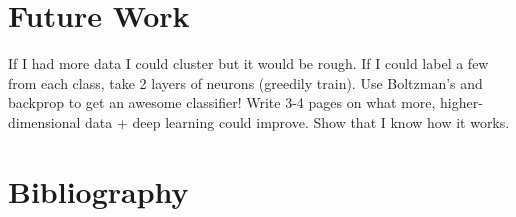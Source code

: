 \documentclass[12pt]{report}
\begin{document}
\chapter{Future Work} \label{FutureWork}
If I had more data I could cluster but it would be rough.
If I could label a few from each class, take 2 layers of neurons (greedily train).
Use Boltzman's and backprop to get an awesome classifier!
Write 3-4 pages on what more, higher-dimensional data + deep learning could improve.
Show that I know how it works.


%
%

%



\chapter*{Bibliography}




\end{document}
